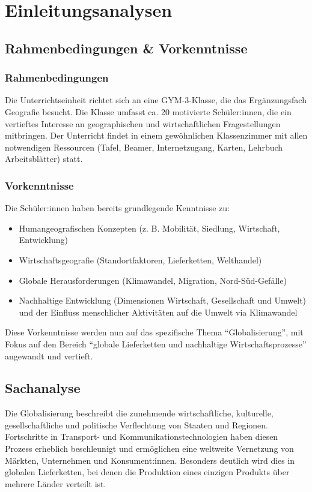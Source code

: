 \chapter{Einleitungsanalysen}
\section{Rahmenbedingungen \& Vorkenntnisse}
\subsection{Rahmenbedingungen}
Die Unterrichtseinheit richtet sich an eine GYM-3-Klasse, die das Ergänzungsfach Geografie besucht. Die Klasse umfasst ca. 20 motivierte Schüler:innen, die ein vertieftes Interesse an geographischen und wirtschaftlichen Fragestellungen mitbringen. Der Unterricht findet in einem gewöhnlichen Klassenzimmer mit allen notwendigen Ressourcen (Tafel, Beamer, Internetzugang, Karten, Lehrbuch Arbeitsblätter) statt.

\subsection{Vorkenntnisse}
Die Schüler:innen haben bereits grundlegende Kenntnisse zu:
\begin{itemize}
    \item Humangeografischen Konzepten (z. B. Mobilität, Siedlung, Wirtschaft, Entwicklung)
    \item Wirtschaftsgeografie (Standortfaktoren, Lieferketten, Welthandel)
    \item Globale Herausforderungen (Klimawandel, Migration, Nord-Süd-Gefälle)
    \item Nachhaltige Entwicklung (Dimensionen Wirtschaft, Gesellschaft und Umwelt) und der Einfluss menschlicher Aktivitäten auf die Umwelt via Klimawandel
\end{itemize}

Diese Vorkenntnisse werden nun auf das spezifische Thema \enquote{Globalisierung}, mit Fokus auf den Bereich \enquote{globale Lieferketten und nachhaltige Wirtschaftsprozesse} angewandt und vertieft.

\section{Sachanalyse}
Die Globalisierung beschreibt die zunehmende wirtschaftliche, kulturelle, gesellschaftliche und politische Verflechtung von Staaten und Regionen. Fortschritte in Transport- und Kommunikationstechnologien haben diesen Prozess erheblich beschleunigt und ermöglichen eine weltweite Vernetzung von Märkten, Unternehmen und Konsument:innen. Besonders deutlich wird dies in globalen Lieferketten, bei denen die Produktion eines einzigen Produkts über mehrere Länder verteilt ist.

